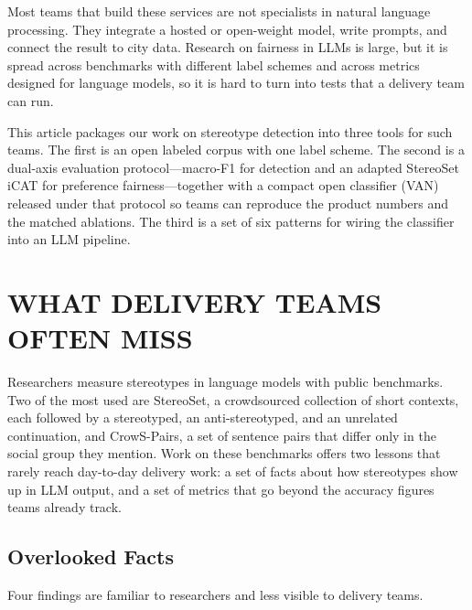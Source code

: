 \documentclass{IEEEcsmag}
\begin{document}
Most teams that build these services are not specialists in natural language processing. They integrate a hosted or open-weight model, write prompts, and connect the result to city data. Research on fairness in LLMs is large,\cite{gallegos2024} but it is spread across benchmarks with different label schemes and across metrics designed for language models, so it is hard to turn into tests that a delivery team can run.

This article packages our work on stereotype detection into three tools for such teams. The first is an open labeled corpus with one label scheme. The second is a dual-axis evaluation protocol---macro-F1 for detection and an adapted StereoSet iCAT for preference fairness---together with a compact open classifier (VAN) released under that protocol so teams can reproduce the product numbers and the matched ablations. The third is a set of six patterns for wiring the classifier into an LLM pipeline.

\section{WHAT DELIVERY TEAMS OFTEN MISS}

Researchers measure stereotypes in language models with public benchmarks. Two of the most used are StereoSet,\cite{nadeem2021} a crowdsourced collection of short contexts, each followed by a stereotyped, an anti-stereotyped, and an unrelated continuation, and CrowS-Pairs,\cite{nangia2020} a set of sentence pairs that differ only in the social group they mention. Work on these benchmarks offers two lessons that rarely reach day-to-day delivery work: a set of facts about how stereotypes show up in LLM output, and a set of metrics that go beyond the accuracy figures teams already track.

\subsection{Overlooked Facts}

Four findings are familiar to researchers and less visible to delivery teams.
\end{document}
